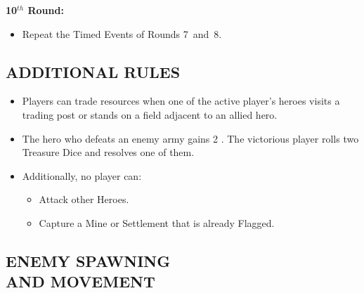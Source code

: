 \begin{multicols*}{2}
\textbf{10$^{th}$ Round:}
\begin{itemize}
  \item Repeat the Timed Events of Rounds \mbox{7 and 8.}
\end{itemize}
\vspace{-0.5em}

\subsection*{\MakeUppercase{Additional Rules}}

\begin{itemize}
  \item Players can trade resources when one of the active player's heroes visits a trading post or stands on a field adjacent to an allied hero.
  \item The hero who defeats an enemy army gains 2 .
    The victorious player rolls two Treasure Dice and resolves one of them.
  \item Additionally, no player can:
  \begin{itemize}
      \item Attack other Heroes.
      \item Capture a Mine or Settlement that is already Flagged.
  \end{itemize}
\end{itemize}

\subsection*{\MakeUppercase{Enemy Spawning\\and Movement}}


\end{multicols*}
